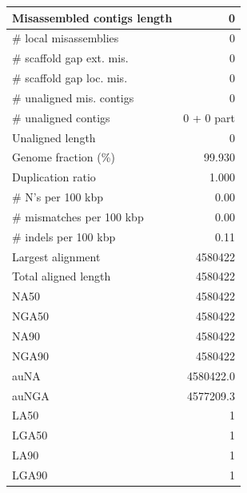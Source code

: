 \documentclass[12pt,a4paper]{article}
\begin{document}
\begin{table}[ht]
\begin{center}
\begin{tabular}{|l*{1}{|r}|}
Misassembled contigs length & 0 \\ \hline
\# local misassemblies & 0 \\ \hline
\# scaffold gap ext. mis. & 0 \\ \hline
\# scaffold gap loc. mis. & 0 \\ \hline
\# unaligned mis. contigs & 0 \\ \hline
\# unaligned contigs & 0 + 0 part \\ \hline
Unaligned length & 0 \\ \hline
Genome fraction (\%) & 99.930 \\ \hline
Duplication ratio & 1.000 \\ \hline
\# N's per 100 kbp & 0.00 \\ \hline
\# mismatches per 100 kbp & 0.00 \\ \hline
\# indels per 100 kbp & 0.11 \\ \hline
Largest alignment & 4580422 \\ \hline
Total aligned length & 4580422 \\ \hline
NA50 & 4580422 \\ \hline
NGA50 & 4580422 \\ \hline
NA90 & 4580422 \\ \hline
NGA90 & 4580422 \\ \hline
auNA & 4580422.0 \\ \hline
auNGA & 4577209.3 \\ \hline
LA50 & 1 \\ \hline
LGA50 & 1 \\ \hline
LA90 & 1 \\ \hline
LGA90 & 1 \\ \hline
\end{tabular}
\end{center}
\end{table}
\end{document}
